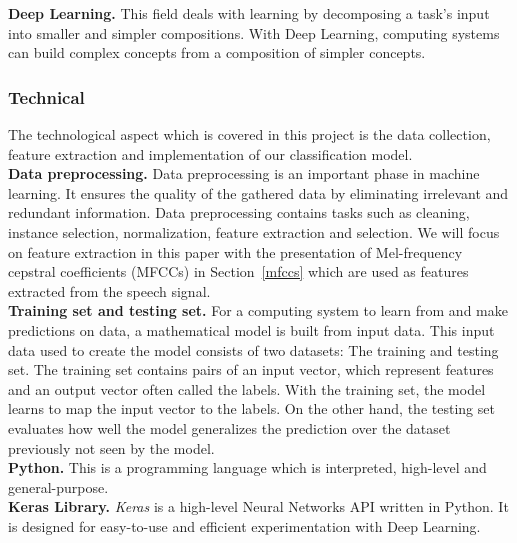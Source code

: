 \textbf{Deep Learning.} This field deals with learning by decomposing a task's
input into smaller and simpler compositions. With Deep Learning, computing
systems can build complex concepts from a composition of simpler concepts.

\subsubsection{Technical} The technological aspect which is covered in this
project is the data collection, feature extraction and implementation of our
classification model. \\

\textbf{Data preprocessing.} Data preprocessing is an important phase in machine
learning. It ensures the quality of the gathered data by eliminating irrelevant
and redundant information. Data preprocessing contains tasks such as cleaning,
instance selection, normalization, feature extraction and selection. We will
focus on feature extraction in this paper with the presentation of Mel-frequency
cepstral coefficients (MFCCs) in Section~\ref{mfccs} which are used as features
extracted from the speech signal.\\


\textbf{Training set and testing set.} For a computing system to learn from and
make predictions on data, a mathematical model is built from input data. This
input data used to create the model consists of two datasets: The training and
testing set. The training set contains pairs of an input vector, which represent
features and an output vector often called the labels. With the training set,
the model learns to map the input vector to the labels. On the other hand, the
testing set evaluates how well the model generalizes the prediction over the
dataset previously not seen by the model.\\

\textbf{Python.} This is a programming language which is interpreted, high-level
and general-purpose.~\cite{Python}\\

\textbf{Keras Library.} \textit{Keras} is a high-level Neural Networks API
written in Python. It is designed for easy-to-use and efficient experimentation
with Deep Learning.~\cite{chollet2015keras}
